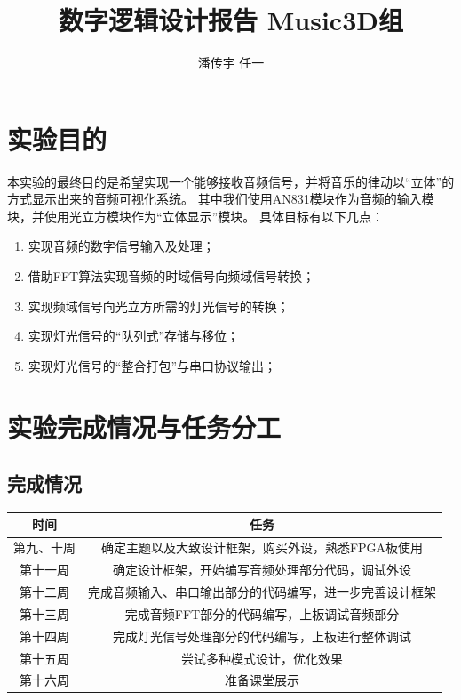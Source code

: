 \documentclass[12pt]{article}
\begin{document}
\title{数字逻辑设计报告 \quad Music3D组}
\author{潘传宇 \quad 任一}
\maketitle

\newpage
\tableofcontents

\newpage
\section{实验目的}
本实验的最终目的是希望实现一个能够接收音频信号，并将音乐的律动以“立体”的方式显示出来的音频可视化系统。
其中我们使用AN831模块作为音频的输入模块，并使用光立方模块作为“立体显示”模块。
具体目标有以下几点：
\begin{enumerate}
    \item 实现音频的数字信号输入及处理；
    \item 借助FFT算法实现音频的时域信号向频域信号转换；
    \item 实现频域信号向光立方所需的灯光信号的转换；
    \item 实现灯光信号的“队列式”存储与移位；
    \item 实现灯光信号的“整合打包”与串口协议输出；
\end{enumerate}

\section{实验完成情况与任务分工}
\subsection{完成情况}
\begin{center}
    \begin{tabular}{|c|c|}
        \hline
        时间& 任务\\
        \hline
        第九、十周& 确定主题以及大致设计框架，购买外设，熟悉FPGA板使用\\
        \hline
        第十一周& 确定设计框架，开始编写音频处理部分代码，调试外设\\
        \hline
        第十二周& 完成音频输入、串口输出部分的代码编写，进一步完善设计框架\\
        \hline
        第十三周& 完成音频FFT部分的代码编写，上板调试音频部分\\
        \hline
        第十四周& 完成灯光信号处理部分的代码编写，上板进行整体调试\\
        \hline
        第十五周& 尝试多种模式设计，优化效果\\
        \hline
        第十六周& 准备课堂展示\\
        \hline
    \end{tabular}
\end{center}
\end{document}
